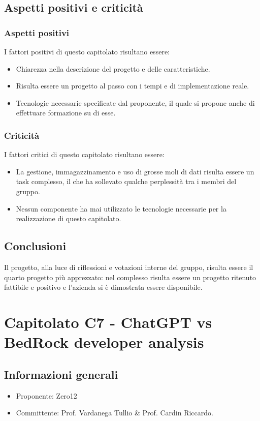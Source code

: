 \documentclass[12pt]{report}
\begin{document}
\section{Aspetti positivi e criticità}
\subsection{Aspetti positivi}
I fattori positivi di questo capitolato risultano essere:
\begin{itemize}
    \item Chiarezza nella descrizione del progetto e delle caratteristiche.
    \item Risulta essere un progetto al passo con i tempi e di implementazione reale.
    \item Tecnologie necessarie specificate dal proponente, il quale si propone anche di effettuare formazione su di esse.
\end{itemize}

\subsection{Criticità}
I fattori critici di questo capitolato risultano essere:
\begin{itemize}
    \item La gestione, immagazzinamento e uso di grosse moli di dati risulta essere un task complesso, il che ha sollevato qualche perplessità tra i membri del gruppo.
    \item Nessun componente ha mai utilizzato le tecnologie necessarie per la realizzazione di questo capitolato.
\end{itemize}

\section{Conclusioni}
Il progetto, alla luce di riflessioni e votazioni interne del gruppo, risulta essere il quarto progetto più apprezzato: nel complesso risulta essere un progetto ritenuto fattibile e positivo e l'azienda si è dimostrata essere disponibile.


\chapter{Capitolato C7 - ChatGPT vs BedRock developer analysis}\label{chapter:7}
\section{Informazioni generali}
\begin{itemize}
    \item Proponente: Zero12
    \item Committente: Prof. Vardanega Tullio \& Prof. Cardin Riccardo.
\end{itemize}
\end{document}
